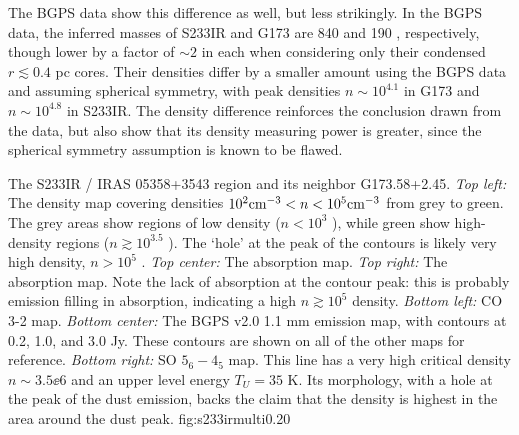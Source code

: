 The BGPS data show this difference as well, but less strikingly.  In the BGPS
data, the inferred masses of S233IR and G173 are 840 and 190 \msun,
respectively, though lower by a factor of $\sim2$ in each when considering only
their condensed $r\lesssim0.4$ pc cores.  Their densities differ by a smaller
amount using the BGPS data and assuming spherical symmetry, with peak densities
$n\sim10^{4.1}$ in G173 and $n\sim10^{4.8}$ in S233IR.  The density difference
reinforces the conclusion drawn from the \formaldehyde data, but also show that its
density measuring power is greater, since the spherical symmetry assumption is known
to be flawed.

%

{The S233IR / IRAS 05358+3543 region and its neighbor G173.58+2.45.
{\it Top left:} The \formaldehyde density map covering densities
$10^2 \textrm{cm}^{-3}<n<10^5 \textrm{cm}^{-3}$ from grey to green.  The grey areas show
regions of low density ($n<10^3$ \percc), while green show high-density
regions ($n\gtrsim10^3.5$ \percc).  The `hole' at the peak of the contours
is likely very high density, $n>10^5$ \percc.
{\it Top center: } The \formaldehyde \oneone absorption map.
{\it Top right: } The \formaldehyde \twotwo absorption map.
Note the lack of absorption at the contour peak: this is probably \twotwo emission
filling in \twotwo absorption, indicating a high $n\gtrsim10^5$ \percc density.
{\it Bottom left: } CO 3-2 map.
{\it Bottom center: } The BGPS v2.0 1.1 mm emission map, with contours at 0.2, 1.0, and 3.0 Jy.
These contours are shown on all of the other maps for reference.
{\it Bottom right: } SO $5_6-4_5$ map.  This line has a very high critical density $n\sim3.5\ee{6}$ \percc
and an upper level energy $T_U=35$ K.
Its morphology, with a hole at the peak of the dust emission, backs the claim that the density is highest
in the area around the dust peak.}
{fig:s233irmulti}{0.2}{0}

